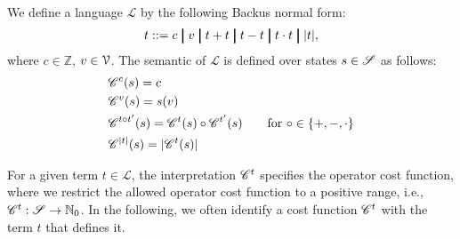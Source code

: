 \begin{definition}\label{def:cost-function}
    We define a language $\mathcal{L}$ by the following Backus normal form:
    \[
        t ::= c \;\mybar\; v \;\mybar\; t + t \;\mybar\; t - t \;\mybar\; t \cdot t \;\mybar\; |t|,
    \]
    where $c \in \mathbb{Z}$, $v \in \mathcal V$.
    The semantic of $\mathcal{L}$ is defined over states $s \in \mathscr S$ as follows:
    \begin{align*}
         & \mathscr C^c(s) = c                                                                                           \\
         & \mathscr C^v(s) = s(v)                                                                                        \\
         & \mathscr C^{t \circ t'}(s) = \mathscr C^t(s)  \circ \mathscr C^{t'}(s) \qquad \text{for } \circ \in \{+,-,\cdot\} \\
         & \mathscr C^{|t|}(s) = |\mathscr C^t(s)|
    \end{align*}

For a given term $t \in \mathcal{L}$, the interpretation $\mathscr C{}^t$ specifies the operator cost function, where we restrict the allowed operator cost function to a positive range, i.e., $\mathscr C{}^t : \mathscr S \to \mathbb{N}_0$. 
In the following, we often identify a cost function $\mathscr C{}^t$ with the term $t$ that defines it. 

\end{definition}


